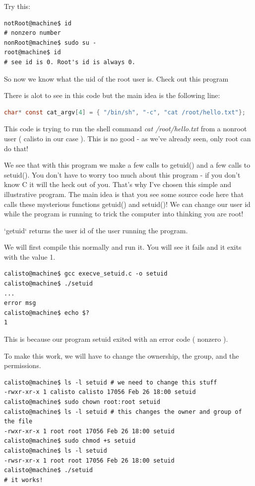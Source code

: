 \documentclass[8pt]{article}
\begin{document}
Try this:
\begin{lstlisting}
notRoot@machine$ id
# nonzero number
nonRoot@machine$ sudo su -
root@machine$ id
# see id is 0. Root's id is always 0.
\end{lstlisting}

So now we know what the uid of the root user is. Check out this program



There is alot to see in this code but the main idea is the following line:

\begin{lstlisting}[language=C]
char* const cat_argv[4] = { "/bin/sh", "-c", "cat /root/hello.txt"};
\end{lstlisting}

This code is trying to run the shell command \textit{cat /root/hello.txt} from a
nonroot user ( calisto in our case ). This is no good - as we've already seen,
only root can do that!

We see that with this program we make a few calls to getuid() and a few calls to setuid().
 You don't have to worry too much about this program - if you don't know C it
will the heck out of you. That's why I've chosen this simple and illustrative program.  
The main idea is that you see some source code here that calls these mysterious functions
getuid() and setuid()! We can change our user id while the program is running to trick the computer into thinking you are root!

`getuid` returns the user id of the user running the program.

We will first compile this normally and run it. You will see it fails and it exits with the value 1.

\begin{lstlisting}
calisto@machine$ gcc execve_setuid.c -o setuid
calisto@machine$ ./setuid
...
error msg
calisto@machine$ echo $?
1
\end{lstlisting}

This is because our program setuid exited with an error code ( nonzero ).

To make this work, we will have to change the ownership, the group, and the permissions.

\begin{lstlisting}
calisto@machine$ ls -l setuid # we need to change this stuff
-rwxr-xr-x 1 calisto calisto 17056 Feb 26 18:00 setuid
calisto@machine$ sudo chown root:root setuid
calisto@machine$ ls -l setuid # this changes the owner and group of the file
-rwxr-xr-x 1 root root 17056 Feb 26 18:00 setuid
calisto@machine$ sudo chmod +s setuid
calisto@machine$ ls -l setuid
-rwsr-xr-x 1 root root 17056 Feb 26 18:00 setuid
calisto@machine$ ./setuid
# it works!
\end{lstlisting}
\end{document}
